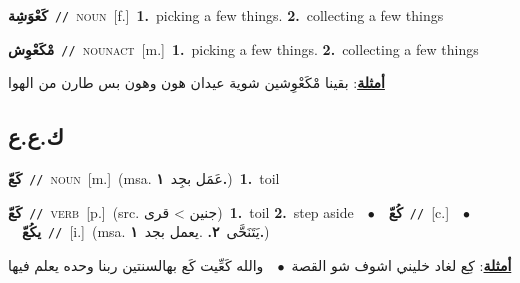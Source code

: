 \documentclass[10pt,a4paper,twoside]{article} %
\begin{document}
\begin{multicols}{2}
{\setlength\topsep{0pt}\textbf{\foreignlanguage{arabic}{كَعْوَشِة}}\ {\color{gray}\texttt{//}\color{black}}\ \textsc{noun}\ [f.]\ \textbf{1.}~picking a few things.  \textbf{2.}~collecting a few things\ } \vspace{2mm}

{\setlength\topsep{0pt}\textbf{\foreignlanguage{arabic}{مْكَعْوِش}}\ {\color{gray}\texttt{//}\color{black}}\ \textsc{noun\textunderscore act}\ [m.]\ \textbf{1.}~picking a few things.  \textbf{2.}~collecting a few things\  \begin{flushright}\color{gray}\foreignlanguage{arabic}{\textbf{\underline{\foreignlanguage{arabic}{أمثلة}}}: بقينا مْكَعْوِشين شوية عيدان هون وهون بس طارن من الهوا}\end{flushright}\color{black}} \vspace{2mm}

\vspace{-3mm}
\subsection*{\color{blue}\foreignlanguage{arabic}{ك.ع.ع}\color{blue}{}} 

{\setlength\topsep{0pt}\textbf{\foreignlanguage{arabic}{كَعّ}}\ {\color{gray}\texttt{//}\color{black}}\ \textsc{noun}\ [m.]\ \color{gray}(msa. \foreignlanguage{arabic}{عَمَل بجِد}~\foreignlanguage{arabic}{\textbf{١.}})\color{black}\ \textbf{1.}~toil\ } \vspace{2mm}

{\setlength\topsep{0pt}\textbf{\foreignlanguage{arabic}{كَعّ}}\ {\color{gray}\texttt{//}\color{black}}\ \textsc{verb}\ [p.]\ (src. \color{gray}\foreignlanguage{arabic}{جنين > قرى}\color{black})\ \textbf{1.}~toil  \textbf{2.}~step aside\ \ $\bullet$\ \ \setlength\topsep{0pt}\textbf{\foreignlanguage{arabic}{كُعّ}}\ {\color{gray}\texttt{//}\color{black}}\ [c.]\ \ $\bullet$\ \ \setlength\topsep{0pt}\textbf{\foreignlanguage{arabic}{يكُعّ}}\ {\color{gray}\texttt{//}\color{black}}\ [i.]\ \color{gray}(msa. \foreignlanguage{arabic}{يَتَنَحَّى}~\foreignlanguage{arabic}{\textbf{٢.}}  .\foreignlanguage{arabic}{يعمل بجد}~\foreignlanguage{arabic}{\textbf{١.}})\color{black}\  \begin{flushright}\color{gray}\foreignlanguage{arabic}{\textbf{\underline{\foreignlanguage{arabic}{أمثلة}}}: كِع لغاد خليني اشوف شو القصة\ $\bullet$\ \  والله كَعِّيت كَع بهالسنتين ربنا وحده يعلم فيها}\end{flushright}\color{black}} \vspace{2mm}


\end{multicols}
\end{document}
